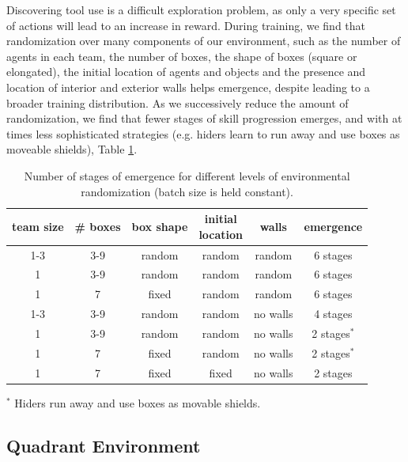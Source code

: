 Discovering tool use is a difficult exploration problem, as only a very specific set of actions will lead to an increase in reward. During training, we find that randomization over many components of our environment, such as the number of agents in each team, the number of boxes, the shape of boxes (square or elongated), the initial location of agents and objects and the presence and location of interior and exterior walls helps emergence, despite leading to a broader training distribution. As we successively reduce the amount of randomization, we find that fewer stages of skill progression emerges, and with at times less sophisticated strategies (e.g. hiders learn to run away and use boxes as moveable shields), Table \ref{table:randomization}.

\begin{table}[h]
\centering
\begin{tabular}{|c|c|c|c|c|c|}
    \hline
    team size & \# boxes & box shape & \makecell{initial \\ location} & walls & emergence\\
    \hline
    1-3 & 3-9 & random & random & random & 6 stages \\
    \hline
    1 & 3-9 & random & random & random & 6 stages \\
    \hline
    1 & 7 & fixed & random & random & 6 stages \\
    \hline
    1-3 & 3-9 & random & random & no walls  & 4 stages \\
    \hline
    1 & 3-9 & random & random & no walls & 2 stages$^*$ \\
    \hline
    1 & 7 & fixed & random & no walls & 2 stages$^*$ \\
    \hline
    1 & 7 & fixed & fixed & no walls & 2 stages \\
    \hline
\end{tabular}
\vspace{.25cm}

$^*$ Hiders run away and use boxes as movable shields.

\caption{Number of stages of emergence for different levels of environmental randomization (batch size is held constant).}
\label{table:randomization}
\end{table}



\subsection{Quadrant Environment}
\label{appendix:quadrant}

